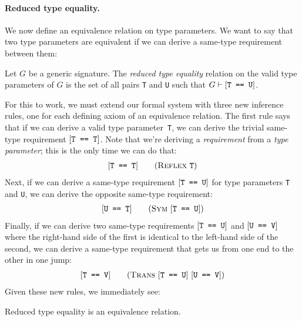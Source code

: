 \documentclass[../generics]{subfiles}
\begin{document}
\paragraph{Reduced type equality.} We now define an equivalence relation on type parameters. We want to say that two type parameters are equivalent if we can derive a same-type requirement between them:

\begin{definition}
Let $G$ be a generic signature. The \emph{reduced type equality} relation on the valid type parameters of $G$ is the set of all pairs \texttt{T} and \texttt{U} such that $G\vdash[\texttt{T == U}]$.
\end{definition}

For this to work, we must extend our formal system with three new inference rules, one for each defining axiom of an equivalence relation. The first rule says that if we can derive a valid type parameter~\texttt{T}, we can derive the trivial same-type requirement $[\texttt{T == T}]$. Note that we're deriving a \emph{requirement} from a \emph{type parameter}; this is the only time we can do that:
\begin{gather*}
\ReflexStepDef
\end{gather*}
Next, if we can derive a same-type requirement $[\texttt{T == U}]$ for type parameters \texttt{T} and \texttt{U}, we can derive the opposite same-type requirement:
\begin{gather*}
\SymStepDef
\end{gather*}
Finally, if we can derive two same-type requirements $[\texttt{T == U}]$ and $[\texttt{U == V}]$ where the right-hand side of the first is identical to the left-hand side of the second, we can derive a same-type requirement that gets us from one end to the other in one jump:
\begin{gather*}
\TransStepDef
\end{gather*}
Given these new rules, we immediately see:
\begin{proposition}
Reduced type equality is an equivalence relation.
\end{proposition}
\end{document}
